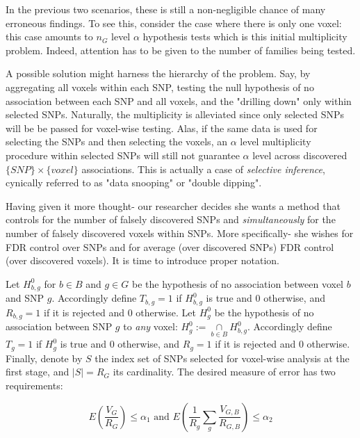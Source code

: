 \documentclass[draft,12pt]{article}
\begin{document}
In the previous two scenarios, these is still a non-negligible chance of many erroneous findings. To see this, consider the case where there is only one voxel: this case amounts to $n_G$ level $\alpha$ hypothesis tests which is this initial multiplicity problem. Indeed, attention has to be given to the number of families being tested. 

A possible solution might harness the hierarchy of the problem. Say, by aggregating all voxels within each SNP, testing the null hypothesis of no association between each SNP and all voxels, and the "drilling down" only within selected SNPs. Naturally, the multiplicity is alleviated since only selected SNPs will be be passed for voxel-wise testing. Alas, if the same data is used for selecting the SNPs and then selecting the voxels, an $\alpha$ level multiplicity procedure within selected SNPs will still not guarantee $\alpha$ level across discovered $\{SNP\} \times \{voxel\}$ associations. This is actually a case of \emph{selective inference}, cynically referred to as "data snooping" or "double dipping". 

Having given it more thought- our researcher decides she wants a method that controls for the number of falsely discovered SNPs and \emph{simultaneously} for the number of falsely discovered voxels within SNPs. More specifically- she wishes for FDR control over SNPs and for average (over discovered SNPs) FDR control (over discovered voxels). It is time to introduce proper notation.


Let $H^0_{b,g}$ for $b \in B$ and $g \in G$ be the hypothesis of no association between voxel $b$ and SNP $g$. 
Accordingly define $T_{b,g}=1$ if $H^0_{b,g}$ is true and 0 otherwise, and $R_{b,g}=1$ if it is rejected and 0 otherwise. Let $H^0_g$ be the hypothesis of no association between SNP $g$ to \emph{any} voxel: $ H^0_g:= \underset{b\in B}{\cap} H^0_{b,g}$.  
Accordingly define $T_{g}=1$ if $H^0_{g}$ is true and 0 otherwise, and $R_{g}=1$ if it is rejected and 0 otherwise. 
Finally, denote by $S$ the index set of SNPs selected for voxel-wise analysis at the first stage, and $\left| S \right|=R_G$ its cardinality. The desired measure of error has two requirements: 


\begin{equation} \label{eq:hirarchial_error}
 E \left(\frac{V_G}{R_G} \right)\leq \alpha_1 
\text{ and } 
E \left( \frac{1}{R_g}\sum_{g} \frac{V_{G,B}}{R_{G,B}} \right)\leq \alpha_2
\end{equation}
\end{document}
